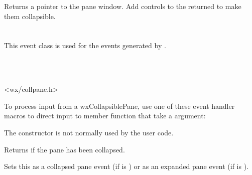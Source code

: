 \label{wxcollapsiblepanegetpane}


Returns a pointer to the pane window. Add controls to the returned 
to make them collapsible.






\section{}\label{wxcollapsiblepaneevent}

This event class is used for the events generated by
.


\\
\\


<wx/collpane.h>


To process input from a wxCollapsiblePane, use one of these event handler macros to
direct input to member function that take a
 argument:

\twocolwidtha{7cm}
\begin{twocollist}
\end{twocollist}%





\label{wxcollapsiblepaneeventctor}


The constructor is not normally used by the user code.


\label{wxcollapsiblepaneeventgetcollapsed}


Returns \true if the pane has been collapsed.


\label{wxcollapsiblepaneeventsetcollapsed}


Sets this as a collapsed pane event (if  is \true) or as an expanded
pane event (if  is \false).

